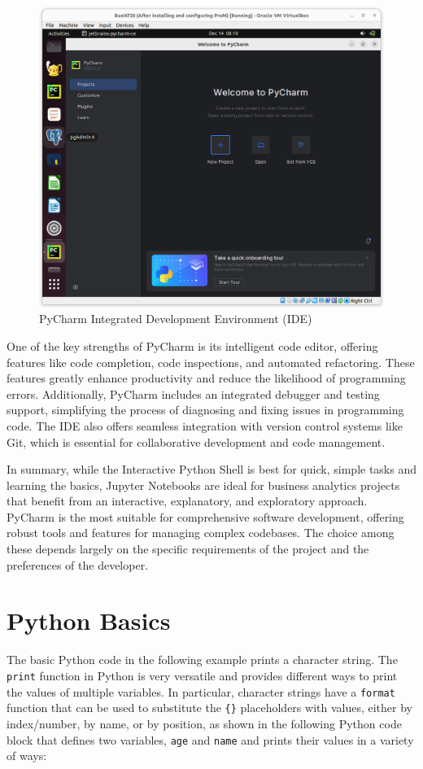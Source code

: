 \begin{figure}
\centering
\includegraphics[width=.75\textwidth]{screen4.png}
\caption{PyCharm Integrated Development Environment (IDE)}
\label{fig:pycharm}
\end{figure}

One of the key strengths of PyCharm is its intelligent code editor, offering features like code completion, code inspections, and automated refactoring. These features greatly enhance productivity and reduce the likelihood of programming errors. Additionally, PyCharm includes an integrated debugger and testing support, simplifying the process of diagnosing and fixing issues in programming code. The IDE also offers seamless integration with version control systems like Git, which is essential for collaborative development and code management.

In summary, while the Interactive Python Shell is best for quick, simple tasks and learning the basics, Jupyter Notebooks are ideal for business analytics projects that benefit from an interactive, explanatory, and exploratory approach. PyCharm is the most suitable for comprehensive software development, offering robust tools and features for managing complex codebases. The choice among these depends largely on the specific requirements of the project and the preferences of the developer.


\section{Python Basics}

The basic Python code in the following example prints a character string. The \texttt{print} function in Python is very versatile and provides different ways to print the values of multiple variables. In particular, character strings have a \texttt{format} function that can be used to substitute the \texttt{\{\}} placeholders with values, either by index/number, by name, or by position, as shown in the following Python code block that defines two variables, \texttt{age} and \texttt{name} and prints their values in a variety of ways:

